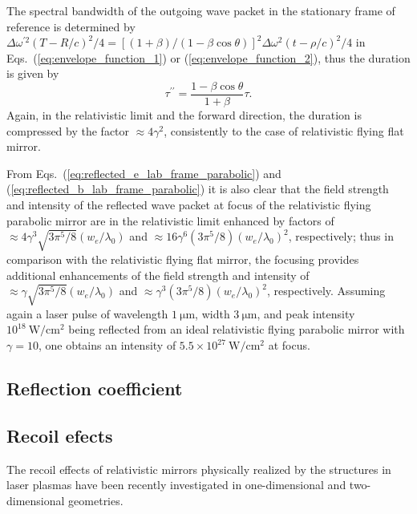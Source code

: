 \documentclass[10pt, a4paper, twoside, openright]{report}
\begin{document}
The spectral bandwidth of the outgoing wave packet in the stationary frame of reference is determined by $ \Delta \omega^{\prime 2} \left( T - R / c \right)^2 / 4 = \left[ \left( 1 + \beta \right) / \left( 1 - \beta \cos \theta \right) \right]^2 \Delta \omega^2 \left( t - \rho / c \right)^2 / 4 $ in Eqs.~(\ref{eq:envelope_function_1}) or (\ref{eq:envelope_function_2}), thus the duration is given by
\begin{equation}\label{key}
	\tau^{\prime \prime} = \frac{1 - \beta \cos \theta}{1 + \beta} \tau.
\end{equation}
Again, in the relativistic limit and the forward direction, the duration is compressed by the factor $ \approx 4 \gamma^2 $, consistently to the case of relativistic flying flat mirror.

From Eqs.~(\ref{eq:reflected_e_lab_frame_parabolic}) and (\ref{eq:reflected_b_lab_frame_parabolic}) it is also clear that the field strength and intensity of the reflected wave packet at focus of the relativistic flying parabolic mirror are in the relativistic limit enhanced by factors of $ \approx 4 \gamma^3 \sqrt{3 \pi^5 / 8} \left( w_e / \lambda_0 \right) $ and $ \approx 16 \gamma^6 \left( 3 \pi^5 / 8 \right) \left( w_e / \lambda_0 \right)^2 $, respectively; thus in comparison with the relativistic flying flat mirror, the focusing provides additional enhancements of the field strength and intensity of $ \approx \gamma \sqrt{3 \pi^5 / 8} \left( w_e / \lambda_0 \right) $ and $ \approx \gamma^3 \left( 3 \pi^5 / 8 \right) \left( w_e / \lambda_0 \right)^2 $, respectively. Assuming again a laser pulse of wavelength $ 1 \ \mathrm{\mu m} $, width $ 3 \ \mathrm{\mu m} $, and peak intensity $ 10^{18} \ \mathrm{W / cm^2} $ being reflected from an ideal relativistic flying parabolic mirror with $ \gamma = 10 $, one obtains an intensity of $ 5.5 \times 10^{27} \ \mathrm{W / cm^2} $ at focus.

\subsection{Reflection coefficient}



\subsection{Recoil efects}

The recoil effects of relativistic mirrors physically realized by the structures in laser plasmas have been recently investigated in one-dimensional \cite{bibid} and two-dimensional \cite{bibid} geometries.
\end{document}
